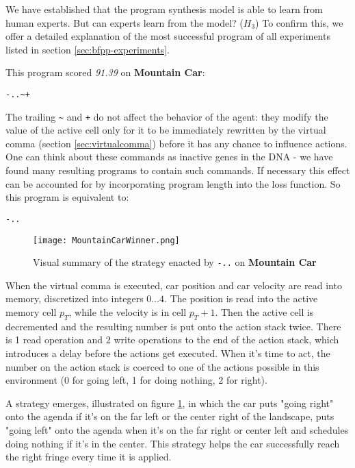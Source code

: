 We have established that the program synthesis model is able to learn from human experts.
But can experts learn from the model? ($H_3$) 
To confirm this, we offer a detailed explanation of the most successful program of all experiments listed in section \ref{sec:bfpp-experiments}.

This program scored \emph{91.39} on \textbf{Mountain Car}:

\begin{center}
\begin{lstlisting}
-..~+
\end{lstlisting}
\end{center}

The trailing \verb|~| and \verb|+| do not affect the behavior of the agent: they modify the value of the active cell only for it to be immediately rewritten by the virtual comma (section \ref{sec:virtualcomma}) before it has any chance to influence actions.
One can think about these commands as inactive genes in the DNA - we have found many resulting programs to contain such commands.
If necessary this effect can be accounted for by incorporating program length into the loss function.
So this program is equivalent to:

\begin{center}
\begin{lstlisting}
-..
\end{lstlisting}
\end{center}

\begin{figure}
    \centering
    \texttt{[image: MountainCarWinner.png]}
    \caption{Visual summary of the strategy enacted by \texttt{-..} on \textbf{Mountain Car}}
    \label{fig:mountaincarwinner}
\end{figure}

When the virtual comma is executed, car position and car velocity are read into memory, discretized into integers $0\dots4$.
The position is read into the active memory cell $p_T$, while the velocity is in cell $p_T+1$.
Then the active cell is decremented and the resulting number is put onto the action stack twice.
There is 1 read operation and 2 write operations to the end of the action stack, which introduces a delay before the actions get executed.
When it's time to act, the number on the action stack is coerced to one of the actions possible in this environment (0 for going left, 1 for doing nothing, 2 for right). 

A strategy emerges, illustrated on figure \ref{fig:mountaincarwinner}, in which the car puts "going right" onto the agenda if it's on the far left or the center right of the landscape, puts "going left" onto the agenda when it's on the far right or center left and schedules doing nothing if it's in the center.
This strategy helps the car successfully reach the right fringe every time it is applied.

